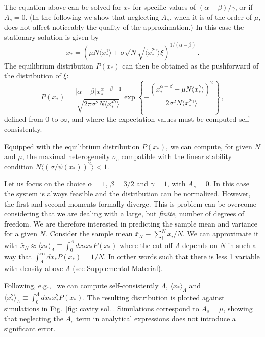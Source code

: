 \documentclass[
 prl,
 twocolumn,
 amsmath,
 amssymb,
 aps,
]{revtex4-2}
\begin{document}
The equation above can be solved for $x_*$ for specific values of
$(\alpha-\beta)/\gamma$, or if $A_s=0$.
(In the following we show that neglecting $A_s$, when it is of the order of $\mu$, does not affect noticeably the quality of the approximation.) In this case the stationary solution is given by 
\begin{equation} \label{eq: cavity solution}
    x_* = \left( \mu N \langle x_*^{\gamma}\rangle + \sigma \sqrt{N} \sqrt{\langle x_*^{2\gamma}\rangle}\xi\right)^{1/(\alpha-\beta)} \, .
\end{equation}
The equilibrium distribution $P(x_*)$ can then be obtained as the pushforward of the distribution of $\xi$: 
\begin{equation}\label{eq: dist general}
    P(x_*)=\frac{|\alpha-\beta|x_*^{\alpha-\beta-1}}{\sqrt{2\pi\sigma^2N \langle x_*^{2\gamma}\rangle}}
    \exp{\left\{-\frac{(x_*^{\alpha-\beta}- \mu N \langle x_*^{\gamma}\rangle)^2}{2\sigma^2N\langle x_*^{2\gamma}\rangle}\right\}} \, ,
\end{equation}
defined from $0$  to $\infty$, and where the expectation values must be computed self-consistently.

Equipped with the equilibrium distribution $P(x_*)$, we can compute, for given $N$ and $\mu$, the maximal heterogeneity $\sigma_c$ compatible with the linear stability condition $N\langle (\sigma/\psi(x_*))^2\rangle < 1$.

Let us focus on the choice $\alpha=1$, $\beta=3/2$ and $\gamma=1$, with $A_s=0$.  
In this case the system is always feasible and the distribution can be normalized. However, the first and second moments formally diverge.
This is problem can be overcome considering that we are dealing with a large, but \emph{finite}, number of degrees of freedom. 
We are therefore interested in predicting the sample mean and variance for a given $N$. Consider the sample mean $\bar{x}_{N}\equiv\sum_{i}^N x_i /N$. We can approximate it with $\bar{x}_N \approx \langle x_* \rangle_{\Lambda} \equiv \int_0^{\Lambda}dx_*x_*P(x_*)$ where the cut-off $\Lambda$ depends on $N$ in such a way that $\int_{\Lambda}^{\infty}dx_*P(x_*)=1/N$. In orther words such that there is less 1 variable with density above $\Lambda$ (see Supplemental Material).

Following, e.g.,~\cite{Cui2020,Hatton2024} we can compute self-consistently $\Lambda$, $\langle x_*\rangle_{\Lambda}$ and $\langle x_*^2\rangle_{\Lambda}\equiv\int_0^{\Lambda}dx_*x_*^2P(x_*)$. The resulting distribution is plotted against simulations in Fig.~\ref{fig: cavity sol.}. Simulations correspond to $A_s=\mu$, showing that neglecting the $A_s$ term in analytical expressions does not introduce a significant error. 
\end{document}
